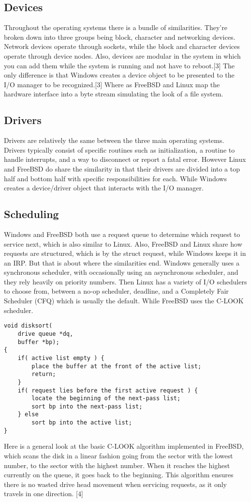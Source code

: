 \documentclass[10pt,conference,draftclsnofoot,onecolumn]{IEEEtran}
\begin{document}
\subsection{Devices}
    Throughout the operating systems there is a bundle of similarities. They’re broken down into three groups being block, character and networking devices. Network devices operate through sockets, while the block and character devices operate through device nodes. Also, devices are modular in the system in which you can add them while the system is running and not have to reboot.[3] The only difference is that Windows creates a device object to be presented to the I/O manager to be recognized.[3] Where as FreeBSD and Linux map the hardware interface into a byte stream simulating the look of a file system.
\subsection{Drivers}
    Drivers are relatively the same between the three main operating systems. Drivers typically consist of specific routines such as initialization, a routine to handle interrupts, and a way to disconnect or report a fatal error. However Linux and FreeBSD do share the similarity in that their drivers are divided into a top half and bottom half with specific responsibilities for each. While Windows creates a device/driver object that interacts with the I/O manager.
\subsection{Scheduling}
    Windows and FreeBSD both use a request queue to determine which request to service next, which is also similar to Linux. Also, FreeBSD and Linux share how requests are structured, which is by the struct request, while Windows keeps it in an IRP. But that is about where the similarities end. Windows generally uses a synchronous scheduler, with occasionally using an asynchronous scheduler, and they rely heavily on priority numbers. Then Linux has a variety of I/O schedulers to choose from, between a no-op scheduler, deadline, and a Completely Fair Scheduler (CFQ) which is usually the default. While FreeBSD uses the C-LOOK scheduler.

\begin{lstlisting}
void disksort(
	drive queue *dq,
	buffer *bp);
{
	if( active list empty ) {
		place the buffer at the front of the active list;
		return;
	}
	if( request lies before the first active request ) {
		locate the beginning of the next-pass list;
		sort bp into the next-pass list;
	} else
		sort bp into the active list;
}
\end{lstlisting}
\center Here is a general look at the basic C-LOOK algorithm implemented in FreeBSD, which scans the disk in a linear fashion going from the sector with the lowest number, to the sector with the highest number. When it reaches the highest currently on the queue, it goes back to the beginning. This algorithm ensures there is no wasted drive head movement when servicing requests, as it only travels in one direction. [4]
\end{document}
